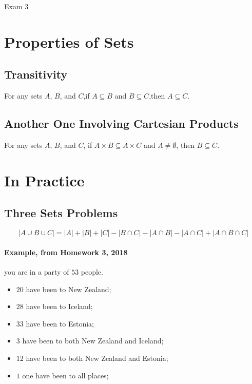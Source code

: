 \documentclass{note}
\newcommand{\intersect}{\cap}
\newcommand{\union}{\cup}
\begin{document}
\begin{note}{Exam 3}
        \section{Properties of Sets}

        \subsection{Transitivity}

        For any sets $ A $, $ B $, and $ C $,if $ A \subseteq B $ and $ B \subseteq C $,then $ A \subseteq C $.

        \subsection{Another One Involving Cartesian Products}

        For any sets $ A $, $ B $, and $ C $, if $ A \times B \subseteq A \times C $ and
        $ A \neq \emptyset $, then $ B \subseteq C $.

        \section{In Practice}

        \subsection{Three Sets Problems}

        \begin{equation}\label{eq: three set equation}
            \left| A \union B \union C \right| = \left| A \right| + \left| B \right| + \left| C \right|
            - \left| B \intersect C \right| - \left| A \intersect B \right| - \left| A \intersect C \right|
            + \left| A \intersect B \intersect C \right|
        \end{equation}

        \paragraph{Example, from Homework 3, 2018} you are in a party of $ 53 $ people.
        \begin{itemize}
            \item $ 20 $ have been to New Zealand;
            \item $ 28 $ have been to Iceland;
            \item $ 33 $ have been to Estonia;
            \item $ 3 $ have been to both New Zealand and Iceland;
            \item $ 12 $ have been to both New Zealand and Estonia;
            \item $ 1 $ one have been to all places;
        \end{itemize}


\end{note}
\end{document}
